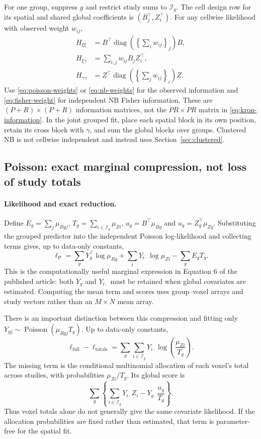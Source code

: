 \documentclass[11pt,a4paper]{article}
\newcommand{\diag}{\operatorname{diag}}
\numberwithin{equation}{section}
\begin{document}
For one group, suppress $g$ and restrict study sums to $\mathcal I_g$.
The cell design row for its spatial and shared global coefficients is
$(B_j^\top,Z_i^\top)$.
For any cellwise likelihood with observed weight $w_{ij}$,
\begin{align}
 H_{\xi\xi}&=B^\top\diag\left(\left\{\sum_i w_{ij}\right\}_j\right)B,\\
 H_{\xi\gamma}&=\sum_{i,j}w_{ij}B_jZ_i^\top,\\
 H_{\gamma\gamma}&=Z^\top\diag\left(\left\{\sum_j w_{ij}\right\}_i\right)Z.
 \label{eq:separable-blocks}
\end{align}
Use \eqref{eq:poisson-weights} or \eqref{eq:nb-weights} for the observed
information and \eqref{eq:fisher-weight} for independent NB Fisher information.
These are $(P+R)\times(P+R)$ information matrices, not the $PR\times PR$
matrix in \eqref{eq:kron-information}. In the joint grouped fit, place each
spatial block in its own position, retain its cross block with $\gamma$,
and sum the global blocks over groups. Clustered NB is not cellwise
independent and instead uses Section~\ref{sec:clustered}.

\subsection{Poisson: exact marginal compression, not loss of study totals}\label{sec:group-poisson}
\paragraph{Likelihood and exact reduction.}
Define $E_g=\sum_j\mu_{Bgj}$, $T_g=\sum_{i\in\mathcal I_g}\mu_{Zi}$,
$a_g=B^\top\mu_{Bg}$ and $u_g=Z_g^\top\mu_{Zg}$.
Substituting the grouped predictor into the independent Poisson
log-likelihood and collecting terms gives, up to data-only constants,
\begin{equation}\label{eq:group-poisson}
 \ell_{\mathrm P}
 =\sum_gY_g^\top\log\mu_{Bg}
   +\sum_iY_{i\cdot}\log\mu_{Zi}-\sum_g E_gT_g.
\end{equation}
This is the computationally useful marginal expression in Equation 6 of
the published article: both $Y_g$ and $Y_{i\cdot}$ must be retained when
global covariates are estimated. Computing the mean term and scores uses
group--voxel arrays and study vectors rather than an $M\times N$ mean array.

There is an important distinction between this compression and fitting only
$Y_{gj}\sim\operatorname{Poisson}(\mu_{Bgj}T_g)$. Up to data-only constants,
\begin{equation}\label{eq:poisson-allocation}
 \ell_{\mathrm{full}}-\ell_{\mathrm{totals}}
 =\sum_g\sum_{i\in\mathcal I_g}Y_{i\cdot}
                   \log\left(\frac{\mu_{Zi}}{T_g}\right).
\end{equation}
The missing term is the conditional multinomial allocation of each voxel's
total across studies, with probabilities $\mu_{Zi}/T_g$. Its global score is
\[
 \sum_g\left\{\sum_{i\in\mathcal I_g}Y_{i\cdot}Z_i
                         -Y_{g\cdot}\frac{u_g}{T_g}\right\}.
\]
Thus voxel totals alone do not generally give the same covariate likelihood.
If the allocation probabilities are fixed rather than estimated, that term
is parameter-free for the spatial fit.
\end{document}
